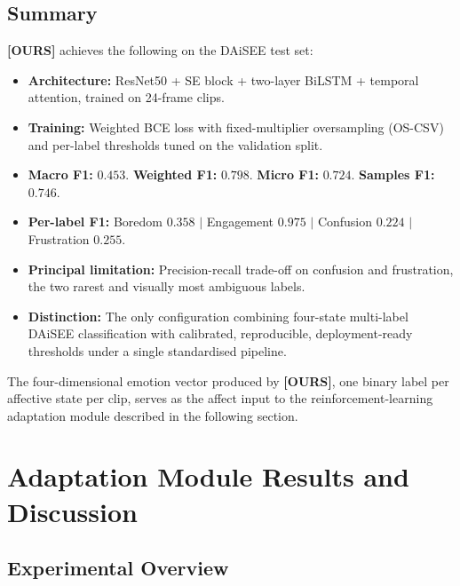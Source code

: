 \subsection{Summary}\label{sec:results_fer_summary}

\textbf{[OURS]} achieves the following on the \ac{DAiSEE} test set:
\begin{itemize}
    \item \textbf{Architecture:} ResNet50 + \ac{SE} block + two-layer
    \ac{BiLSTM} + temporal attention, trained on 24-frame clips.
    \item \textbf{Training:} Weighted \ac{BCE} loss with fixed-multiplier
    oversampling (OS-CSV) and per-label thresholds tuned on the
    validation split.
    \item \textbf{Macro F1:} $0.453$. \textbf{Weighted F1:} $0.798$.
    \textbf{Micro F1:} $0.724$. \textbf{Samples F1:} $0.746$.
    \item \textbf{Per-label F1:} Boredom $0.358$ $|$ Engagement
    $0.975$ $|$ Confusion $0.224$ $|$ Frustration $0.255$.
    \item \textbf{Principal limitation:} Precision-recall trade-off
    on confusion and frustration, the two rarest and visually most
    ambiguous labels.
    \item \textbf{Distinction:} The only configuration combining
    four-state multi-label \ac{DAiSEE} classification with calibrated,
    reproducible, deployment-ready thresholds under a single
    standardised pipeline.
\end{itemize}

The four-dimensional emotion vector produced by \textbf{[OURS]},
one binary label per affective state per clip, serves as the
affect input to the reinforcement-learning adaptation module
described in the following section.


\section{Adaptation Module Results and Discussion}\label{sec:results_adapt_part}

\subsection{Experimental Overview}\label{sec:results_adapt_overview}

